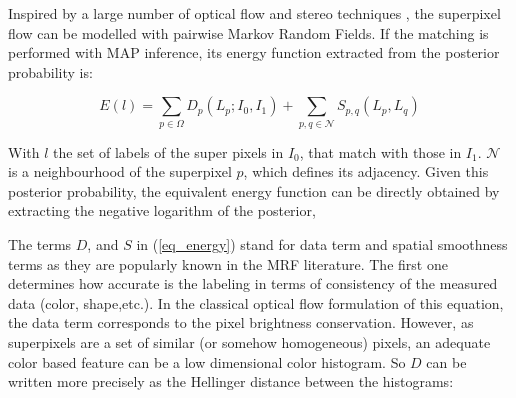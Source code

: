 

Inspired by a large number of optical flow and stereo techniques \cite{c7}\cite{c12}\cite{c13}, 
the superpixel flow can be modelled with pairwise Markov Random Fields. If
the matching is performed with MAP inference, its energy function extracted from the posterior probability is: 


\begin{equation}
E(l) = \displaystyle \sum_{p \in \Omega} D_p(L_p;I_0,I_1) +
\sum_{p,q \in \mathcal{N}} S_{p,q}(L_p,L_q)
\label{eq_energy}
\end{equation}

With $l$ the set of labels of the super pixels in $I_0$,
that match with those in $I_1$.
$ \mathcal{N} $ is a neighbourhood of the
superpixel $p$, which defines its adjacency. Given this posterior probability,
the equivalent energy function can be directly obtained
by extracting the negative logarithm of the posterior,

The terms $D$, and $S$ in (\ref{eq_energy}) stand for data term and spatial smoothness terms as they
are popularly known in the MRF literature. The first one determines how accurate is the labeling in terms
of consistency of the measured data (color, shape,etc.). In the classical optical flow formulation of this equation,
the data term corresponds to the pixel brightness conservation\cite{c7}\cite{c5}. However, as superpixels are a set
of similar (or somehow homogeneous) pixels, an adequate color based feature can be a low dimensional
color histogram. So $D$ can be written more precisely as the Hellinger distance between the histograms:

